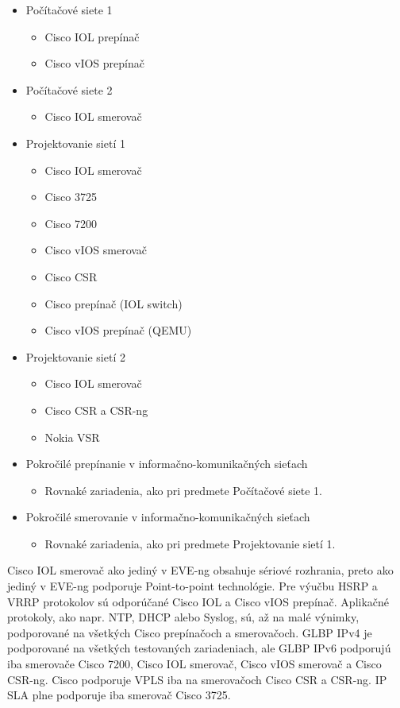 \begin{itemize}[noitemsep]
    \item Počítačové siete 1
    \begin{itemize}[noitemsep]
        \item Cisco IOL prepínač
        \item Cisco vIOS prepínač
    \end{itemize}
    \item Počítačové siete 2
    \begin{itemize}[noitemsep]
        \item Cisco IOL smerovač
    \end{itemize}
    \item Projektovanie sietí 1
    \begin{itemize}[noitemsep]
        \item Cisco IOL smerovač
        \item Cisco 3725
        \item Cisco 7200
        \item Cisco vIOS smerovač
        \item Cisco CSR
        \item Cisco prepínač (IOL switch)
        \item Cisco vIOS prepínač (QEMU)
    \end{itemize}
    \item Projektovanie sietí 2
    \begin{itemize}[noitemsep]
        \item Cisco IOL smerovač
        \item Cisco CSR a CSR-ng
        \item Nokia VSR
    \end{itemize}
    \item Pokročilé prepínanie v informačno-komunikačných sieťach
    \begin{itemize}[noitemsep]
        \item Rovnaké zariadenia, ako pri predmete Počítačové siete 1.
    \end{itemize}
    \item Pokročilé smerovanie v informačno-komunikačných sieťach
    \begin{itemize}[noitemsep]
        \item Rovnaké zariadenia, ako pri predmete Projektovanie sietí 1.
    \end{itemize}
\end{itemize}

Cisco IOL smerovač ako jediný v EVE-ng obsahuje sériové rozhrania, preto ako jediný v EVE-ng podporuje Point-to-point technológie. Pre výučbu HSRP a VRRP protokolov sú odporúčané Cisco IOL a Cisco vIOS prepínač. Aplikačné protokoly, ako napr. NTP, DHCP alebo Syslog, sú, až na malé výnimky, podporované na všetkých Cisco prepínačoch a smerovačoch. GLBP IPv4 je podporované na všetkých testovaných zariadeniach, ale GLBP IPv6 podporujú iba smerovače Cisco 7200, Cisco IOL smerovač, Cisco vIOS smerovač a Cisco CSR-ng. Cisco podporuje VPLS iba na smerovačoch Cisco CSR a CSR-ng. IP SLA plne podporuje iba smerovač Cisco 3725.

